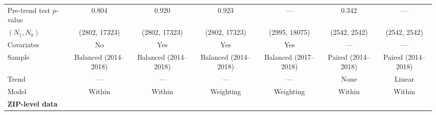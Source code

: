 \begin{table}[tbh]
\begin{threeparttable}
\begin{tabular}{lcccccc}
\quad Pre-trend test $p$-value   &                                                 $0.804$ &                                                 $0.920$ &                                                 $0.923$ &                                                     --- &                                                 $0.342$ &                                                     --- \\
\quad $(N_1, N_0)$               &                                           (2802, 17323) &                                           (2802, 17323) &                                           (2802, 17323) &                                           (2995, 18075) &                                            (2542, 2542) &                                            (2542, 2542) \\
\quad Covariates                 &                                                      No &                                                     Yes &                                                     Yes &                                                     Yes &                                                     --- &                                                     --- \\
\quad Sample                     &                                   Balanced (2014--2018) &                                   Balanced (2014--2018) &                                   Balanced (2014--2018) &                                   Balanced (2017--2018) &                                     Paired (2014--2018) &                                     Paired (2014--2018) \\
\quad Trend                      &                                                     --- &                                                     --- &                                                     --- &                                                     --- &                                                    None &                                                  Linear \\
\quad Model                      &                                                  Within &                                                  Within &                                               Weighting &                                               Weighting &                                                  Within &                                                  Within \\
\midrule \textbf{ZIP-level data} &                                                         &                                                         &                                                         &                                                         &                                                         &                                                         \\

\end{tabular}
\end{threeparttable}
\end{table}
